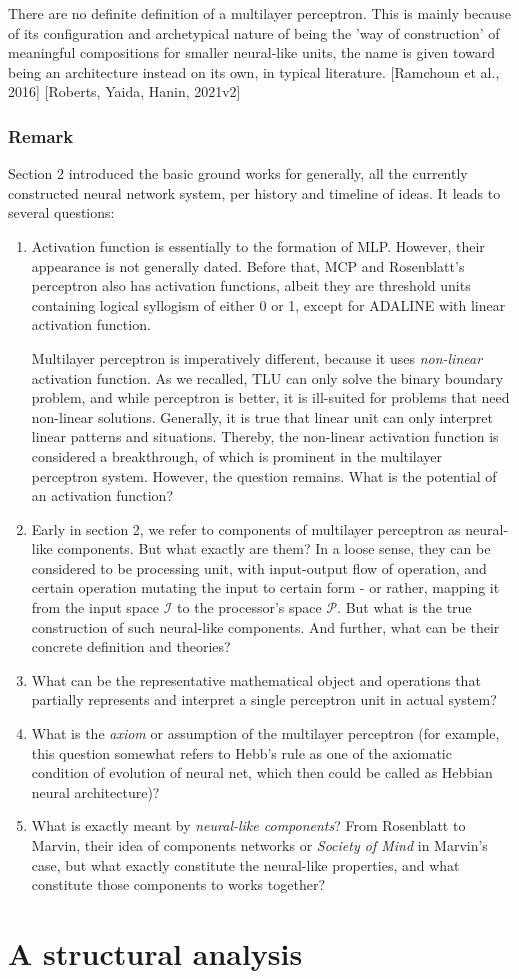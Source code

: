 There are no definite definition of a multilayer perceptron. This is mainly because of its configuration and archetypical nature of being the 'way of construction' of meaningful compositions for smaller neural-like units, the name is given toward being an architecture instead on its own, in typical literature. [Ramchoun et al., 2016] [Roberts, Yaida, Hanin, 2021v2]

\subsubsection{Remark}

Section 2 introduced the basic ground works for generally, all the currently constructed neural network system, per history and timeline of ideas. It leads to several questions:

{
    \small
\begin{enumerate}[leftmargin=13pt]
  \item Activation function is essentially to the formation of MLP. However, their appearance is not generally dated. Before that, MCP and Rosenblatt's perceptron also has activation functions, albeit they are threshold units containing logical syllogism of either 0 or 1, except for ADALINE with linear activation function. 
  
  Multilayer perceptron is imperatively different, because it uses \textit{non-linear} activation function. As we recalled, TLU can only solve the binary boundary problem, and while perceptron is better, it is ill-suited for problems that need non-linear solutions. Generally, it is true that linear unit can only interpret linear patterns and situations. Thereby, the non-linear activation function is considered a breakthrough, of which is prominent in the multilayer perceptron system. However, the question remains. What is the potential of an activation function? 
  \item Early in section 2, we refer to components of multilayer perceptron as neural-like components. But what exactly are them? In a loose sense, they can be considered to be processing unit, with input-output flow of operation, and certain operation mutating the input to certain form - or rather, mapping it from the input space $\mathcal{I}$ to the processor's space $\mathcal{P}$. But what is the true construction of such neural-like components. And further, what can be their concrete definition and theories? 
  \item What can be the representative mathematical object and operations that partially represents and interpret a single perceptron unit in actual system? 
  \item What is the \textit{axiom} or assumption of the multilayer perceptron (for example, this question somewhat refers to Hebb's rule as one of the axiomatic condition of evolution of neural net, which then could be called as Hebbian neural architecture)? 
  \item What is exactly meant by \textit{neural-like components}? From Rosenblatt to Marvin, their idea of components networks or \textit{Society of Mind} in Marvin's case, but what exactly constitute the neural-like properties, and what constitute those components to works together? 
\end{enumerate}
}

\section{A structural analysis}
